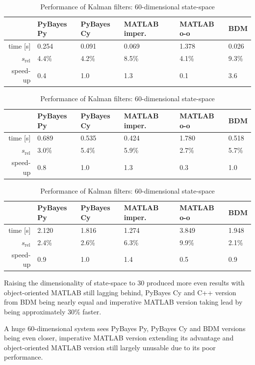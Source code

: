 \begin{table}[h!]
	\centering
	\begin{tabular}{|r|l|l|l|l|l|} \hline
		& PyBayes Py & PyBayes Cy & MATLAB imper. & MATLAB o-o & BDM \\ \hline
		time [s] & 0.254 & 0.091 & 0.069 & 1.378 & 0.026 \\ \hline
		\(s_{\text{rel}}\) & 4.4\% & 4.2\% & 8.5\% & 4.1\% & 9.3\% \\ \hline
		speed-up & 0.4\x & 1.0\x & 1.3\x & 0.1\x & 3.6\x \\ \hline
	\end{tabular}
	\caption{Performance of Kalman filters: 2-dimensional state-space}
	\label{tab:KFSmall}
	\vspace{7mm}

	\begin{tabular}{|r|l|l|l|l|l|} \hline
		& PyBayes Py & PyBayes Cy & MATLAB imper. & MATLAB o-o & BDM \\ \hline
		time [s] & 0.689 & 0.535 & 0.424 & 1.780 & 0.518 \\ \hline
		\(s_{\text{rel}}\) & 3.0\% & 5.4\% & 5.9\% & 2.7\% & 5.7\% \\ \hline
		speed-up & 0.8\x & 1.0\x & 1.3\x & 0.3\x & 1.0\x \\ \hline
	\end{tabular}
	\caption{Performance of Kalman filters: 30-dimensional state-space}
	\label{tab:KFBig}
	\vspace{7mm}

	\begin{tabular}{|r|l|l|l|l|l|} \hline
		& PyBayes Py & PyBayes Cy & MATLAB imper. & MATLAB o-o & BDM \\ \hline
		time [s] & 2.120 & 1.816 & 1.274 & 3.849 & 1.948 \\ \hline
		\(s_{\text{rel}}\) & 2.4\% & 2.6\% & 6.3\% & 9.9\% & 2.1\% \\ \hline
		speed-up & 0.9\x & 1.0\x & 1.4\x & 0.5\x & 0.9\x \\ \hline
	\end{tabular}
	\caption{Performance of Kalman filters: 60-dimensional state-space}
	\label{tab:KFHuge}
\end{table}

Raising the dimensionality of state-space to 30 produced more even results with object-oriented
MATLAB still lagging behind, PyBayes Cy and C++ version from BDM being nearly equal and imperative
MATLAB version taking lead by being approximately 30\% faster.

A huge 60-dimensional system sees PyBayes Py, PyBayes Cy and BDM versions being even closer,
imperative MATLAB version extending its advantage and object-oriented MATLAB version still largely
unusable due to its poor performance.

